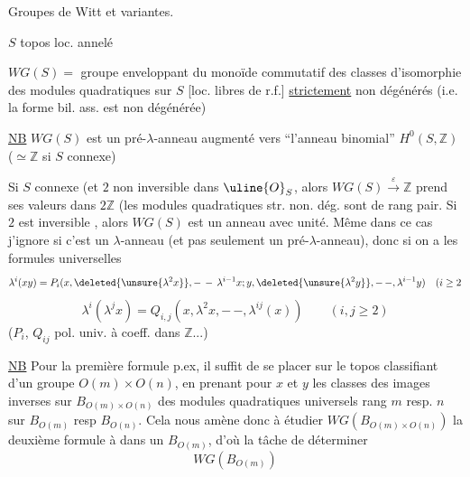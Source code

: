 Groupes de Witt et variantes.

$S$ topos loc. annelé

$WG(S)=$ groupe enveloppant du monoïde commutatif
 des classes d'isomorphie des modules quadratiques
 sur $S$ [loc. libres de r.f.] \uline{strictement} non
 dégénérés (i.e. la forme bil. ass. est non
 dégénérée)

\uline{NB} $WG(S)$ est un pré-$\lambda$-anneau
 augmenté vers
``l'anneau binomial'' $H^0(S,\mathbb Z)$ ($\simeq\mathbb Z$ si $S$ connexe)

Si $S$ connexe  (et $2$ non inversible dans $\uline{O}_S$,
alors $WG(S)\xrightarrow{\varepsilon}\mathbb Z$ prend ses valeurs dans $2\mathbb Z$
(les modules quadratiques str. non. dég. sont de
rang pair. Si $2$ est inversible , alors
$WG(S)$ est un anneau avec unité. Même
dans ce cas j'ignore si c'est un $\lambda$-anneau
(et pas seulement un pré-$\lambda$-anneau), donc
si on a les formules universelles
\[
\lambda^i(xy)=P_i(x,\deleted{\unsure{\lambda^2x}},-\,-\,\lambda^{i-1}x;
 y,\deleted{\unsure{\lambda^2y}},-\,-,\lambda^{i-1}y)\quad(i\ge2
\]
\[
\lambda^i(\lambda^j x)=Q_{i,j}(x,\lambda^2x,-\,-,\lambda^{ij}(x))
\qquad(i,j\ge2)
\]
($P_i$, $Q_{ij}$ pol. univ. à coeff. dans $\mathbb Z$...)

\uline{NB} Pour la première formule p.ex, il suffit de se
placer sur le topos classifiant d'un
groupe $O(m)\times O(n)$, en prenant pour $x$ et $y$
les classes des images inverses sur $B_{O(m)\times O(n)}$
des  modules quadratiques universels
 rang $m$ resp. $n$ sur $B_{O(m)}$ resp $B_{O(n)}$.
Cela nous amène donc à étudier $WG(B_{O(m)\times O(n)})$
 la deuxième formule à  dans
un $B_{O(m)}$, d'où la tâche de déterminer
\[
WG(B_{O(m)})
\]

